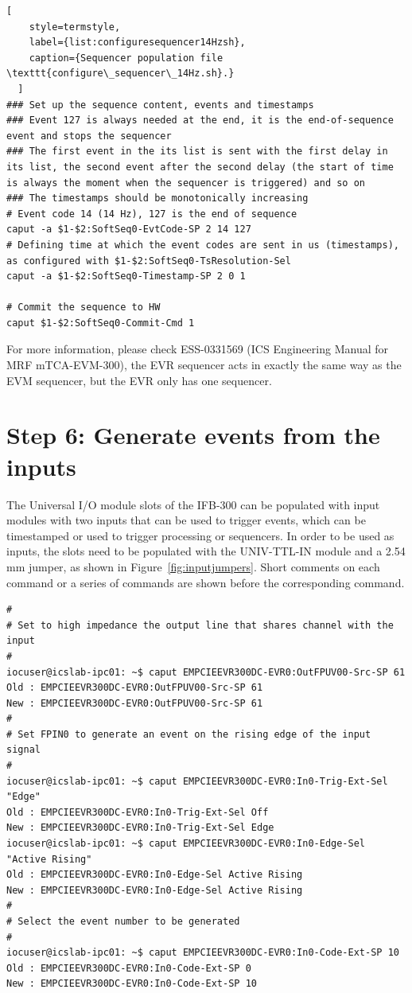 \documentclass[11pt
  , a4paper
  , article
  , oneside
  , showtrims
]{memoir}
\begin{document}
{\begin{lstlisting}[
    style=termstyle,
    label={list:configuresequencer14Hzsh},
    caption={Sequencer population file \texttt{configure\_sequencer\_14Hz.sh}.}
  ]
### Set up the sequence content, events and timestamps
### Event 127 is always needed at the end, it is the end-of-sequence event and stops the sequencer
### The first event in the its list is sent with the first delay in its list, the second event after the second delay (the start of time is always the moment when the sequencer is triggered) and so on
### The timestamps should be monotonically increasing
# Event code 14 (14 Hz), 127 is the end of sequence
caput -a $1-$2:SoftSeq0-EvtCode-SP 2 14 127
# Defining time at which the event codes are sent in us (timestamps), as configured with $1-$2:SoftSeq0-TsResolution-Sel
caput -a $1-$2:SoftSeq0-Timestamp-SP 2 0 1

# Commit the sequence to HW
caput $1-$2:SoftSeq0-Commit-Cmd 1
\end{lstlisting}
For more information, please check ESS-0331569 (ICS Engineering Manual for MRF mTCA-EVM-300), the EVR sequencer acts in exactly the same way as the EVM sequencer, but the EVR only has one sequencer.\\


\section{Step 6: Generate events from the inputs}
The Universal I/O module slots of the IFB-300 can be populated with input modules with two inputs that can be used to trigger events, which can be timestamped or used to trigger processing or sequencers. In order to be used as inputs, the slots need to be populated with the UNIV-TTL-IN module and a 2.54 mm jumper, as shown in Figure~\ref{fig:inputjumpers}. Short comments on each command or a series of commands are shown before the corresponding command.
\begin{lstlisting}[style=termstyle]
#
# Set to high impedance the output line that shares channel with the input
#
iocuser@icslab-ipc01: ~$ caput EMPCIEEVR300DC-EVR0:OutFPUV00-Src-SP 61
Old : EMPCIEEVR300DC-EVR0:OutFPUV00-Src-SP 61
New : EMPCIEEVR300DC-EVR0:OutFPUV00-Src-SP 61
#
# Set FPIN0 to generate an event on the rising edge of the input signal
#
iocuser@icslab-ipc01: ~$ caput EMPCIEEVR300DC-EVR0:In0-Trig-Ext-Sel "Edge"
Old : EMPCIEEVR300DC-EVR0:In0-Trig-Ext-Sel Off
New : EMPCIEEVR300DC-EVR0:In0-Trig-Ext-Sel Edge
iocuser@icslab-ipc01: ~$ caput EMPCIEEVR300DC-EVR0:In0-Edge-Sel "Active Rising"
Old : EMPCIEEVR300DC-EVR0:In0-Edge-Sel Active Rising
New : EMPCIEEVR300DC-EVR0:In0-Edge-Sel Active Rising
#
# Select the event number to be generated
#
iocuser@icslab-ipc01: ~$ caput EMPCIEEVR300DC-EVR0:In0-Code-Ext-SP 10
Old : EMPCIEEVR300DC-EVR0:In0-Code-Ext-SP 0
New : EMPCIEEVR300DC-EVR0:In0-Code-Ext-SP 10
\end{lstlisting}

}
\end{document}

